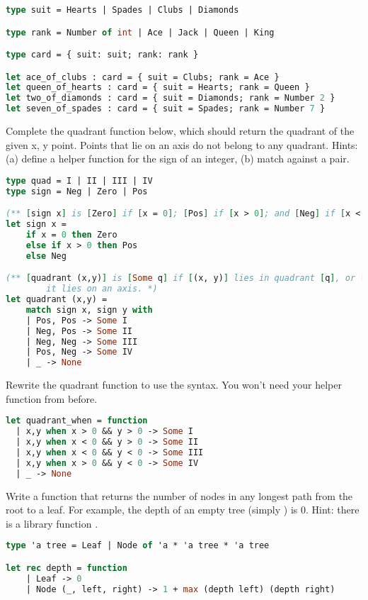 \begin{lstlisting}[language=OCaml]
type suit = Hearts | Spades | Clubs | Diamonds

type rank = Number of int | Ace | Jack | Queen | King

type card = { suit: suit; rank: rank }

let ace_of_clubs : card = { suit = Clubs; rank = Ace }
let queen_of_hearts : card = { suit = Hearts; rank = Queen }
let two_of_diamonds : card = { suit = Diamonds; rank = Number 2 }
let seven_of_spades : card = { suit = Spades; rank = Number 7 }
\end{lstlisting}

\problem[quadrant]
Complete the quadrant function below, which should return the quadrant of the given x, y point. Points that lie on an axis do not belong to any quadrant. Hints: (a) define a helper function for the sign of an integer, (b) match against a pair.

\begin{lstlisting}[language=OCaml]
type quad = I | II | III | IV
type sign = Neg | Zero | Pos

(** [sign x] is [Zero] if [x = 0]; [Pos] if [x > 0]; and [Neg] if [x < 0]. *)
let sign x =
	if x = 0 then Zero
	else if x > 0 then Pos
	else Neg

(** [quadrant (x,y)] is [Some q] if [(x, y)] lies in quadrant [q], or [None] if
		it lies on an axis. *)
let quadrant (x,y) =
	match sign x, sign y with
	| Pos, Pos -> Some I
	| Neg, Pos -> Some II
	| Neg, Neg -> Some III
	| Pos, Neg -> Some IV
	| _ -> None
\end{lstlisting}


Rewrite the quadrant function to use the  syntax. You won't need your helper function from before.

\begin{lstlisting}[language=OCaml]
let quadrant_when = function
  | x,y when x > 0 && y > 0 -> Some I
  | x,y when x < 0 && y > 0 -> Some II
  | x,y when x < 0 && y < 0 -> Some III
  | x,y when x > 0 && y < 0 -> Some IV
  | _ -> None
\end{lstlisting}


\problem[depth]
Write a function  that returns the number of nodes in any longest path from the root to a leaf. For example, the depth of an empty tree (simply ) is 0. Hint: there is a library function .

\begin{lstlisting}[language=OCaml]
type 'a tree = Leaf | Node of 'a * 'a tree * 'a tree

let rec depth = function
	| Leaf -> 0
	| Node (_, left, right) -> 1 + max (depth left) (depth right)
\end{lstlisting}


